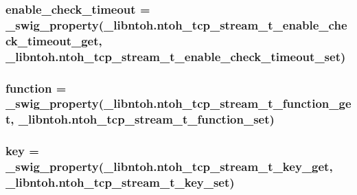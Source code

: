 \hypertarget{classlibntoh_1_1ntoh__tcp__stream__t_a0047b061bc7280f819c498e3d27487ce}{
\subsubsection[{enable\-\_\-check\-\_\-timeout}]{ enable\-\_\-check\-\_\-timeout = {\bf \-\_\-swig\-\_\-property}(\-\_\-libntoh.\-ntoh\-\_\-tcp\-\_\-stream\-\_\-t\-\_\-enable\-\_\-check\-\_\-timeout\-\_\-get, \-\_\-libntoh.\-ntoh\-\_\-tcp\-\_\-stream\-\_\-t\-\_\-enable\-\_\-check\-\_\-timeout\-\_\-set)\hspace{0.3cm}{\ttfamily [static]}}}\label{classlibntoh_1_1ntoh__tcp__stream__t_a0047b061bc7280f819c498e3d27487ce}
\hypertarget{classlibntoh_1_1ntoh__tcp__stream__t_a543077174a1281b9d00884a11a040629}{
\subsubsection[{function}]{ function = {\bf \-\_\-swig\-\_\-property}(\-\_\-libntoh.\-ntoh\-\_\-tcp\-\_\-stream\-\_\-t\-\_\-function\-\_\-get, \-\_\-libntoh.\-ntoh\-\_\-tcp\-\_\-stream\-\_\-t\-\_\-function\-\_\-set)\hspace{0.3cm}{\ttfamily [static]}}}\label{classlibntoh_1_1ntoh__tcp__stream__t_a543077174a1281b9d00884a11a040629}
\hypertarget{classlibntoh_1_1ntoh__tcp__stream__t_a29eb8dd921f77e19e24a20bcd820c2ed}{
\subsubsection[{key}]{ key = {\bf \-\_\-swig\-\_\-property}(\-\_\-libntoh.\-ntoh\-\_\-tcp\-\_\-stream\-\_\-t\-\_\-key\-\_\-get, \-\_\-libntoh.\-ntoh\-\_\-tcp\-\_\-stream\-\_\-t\-\_\-key\-\_\-set)\hspace{0.3cm}{\ttfamily [static]}}}\label{classlibntoh_1_1ntoh__tcp__stream__t_a29eb8dd921f77e19e24a20bcd820c2ed}
